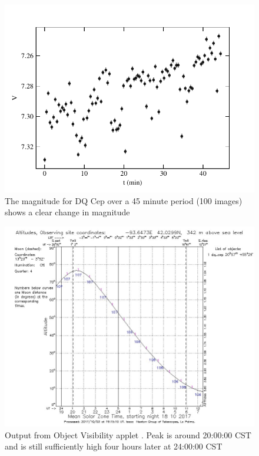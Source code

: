 \documentclass[]{article}
\begin{document}
\begin{figure}[H]
	\includegraphics[width=\linewidth]{figs/mags.pdf}
	\caption{The magnitude for DQ Cep over a 45 minute period (100 images) shows a clear change in magnitude}
	\label{fig:mags}
\end{figure}
\begin{figure}[H]
	\includegraphics[width=\linewidth]{figs/staralt.png}
	\caption{Output from \textcite{staralt} Object Visibility applet . Peak is around 20:00:00 CST and is still sufficiently high four hours later at 24:00:00 CST}
	\label{fig:staralt}
\end{figure}
\end{document}
